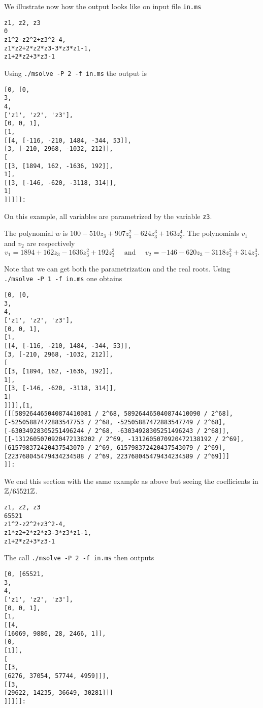 \documentclass[a4paper,english,11pt]{scrartcl}
\theoremstyle{definition}
\theoremstyle{remark}
\begin{document}
We illustrate now how the output looks like on input file \verb+in.ms+
\begin{tcolorbox}
\begin{verbatim}
z1, z2, z3
0
z1^2-z2^2+z3^2-4,
z1*z2+2*z2*z3-3*z3*z1-1,
z1+2*z2+3*z3-1
\end{verbatim}
\end{tcolorbox}
Using \verb+./msolve -P 2 -f in.ms+ the output is 
\begin{tcolorbox}
\begin{verbatim}
[0, [0, 
3, 
4, 
['z1', 'z2', 'z3'],
[0, 0, 1],
[1,
[[4, [-116, -210, 1484, -344, 53]],
[3, [-210, 2968, -1032, 212]],
[
[[3, [1894, 162, -1636, 192]],
1],
[[3, [-146, -620, -3118, 314]],
1]
]]]]]:
\end{verbatim}
\end{tcolorbox}
On this example, all variables are parametrized by the variable \verb+z3+. 

The polynomial $w$ is $100-510z_3 + 907z_3^2 -624z_3^3+ 163z_3^4$. 
The polynomials $v_1$ and $v_2$ are respectively 
\[
    v_1 = 1894 + 162 z_3 -1636 z_3^2+ 192 z_3^3 \quad \text{ and } 
    \quad v_2 = -146 -620 z_3 -3118 z_3^2+ 314 z_3^3.
\]

Note that we can get both the parametrization and the real roots. Using 
\verb+./msolve -P 1 -f in.ms+ one obtains

\begin{verbatim}
[0, [0, 
3, 
4, 
['z1', 'z2', 'z3'],
[0, 0, 1],
[1,
[[4, [-116, -210, 1484, -344, 53]],
[3, [-210, 2968, -1032, 212]],
[
[[3, [1894, 162, -1636, 192]],
1],
[[3, [-146, -620, -3118, 314]],
1]
]]]],[1,
[[[589264465040874410081 / 2^68, 589264465040874410090 / 2^68], [-52505887472883547753 / 2^68, -52505887472883547749 / 2^68], [-63034928305251496244 / 2^68, -63034928305251496243 / 2^68]], [[-1312605070920472138202 / 2^69, -1312605070920472138192 / 2^69], [615798372420437543070 / 2^69, 615798372420437543079 / 2^69], [223768045479434234588 / 2^69, 223768045479434234589 / 2^69]]]
]]:
\end{verbatim}

We end this section with the same example as above but seeing the coefficients in 
\(\mathbb{Z}/65521\mathbb{Z}\).
\begin{verbatim}
z1, z2, z3
65521
z1^2-z2^2+z3^2-4,
z1*z2+2*z2*z3-3*z3*z1-1,
z1+2*z2+3*z3-1
\end{verbatim}
The call \verb+./msolve -P 2 -f in.ms+ then outputs
\begin{verbatim}
[0, [65521, 
3, 
4, 
['z1', 'z2', 'z3'],
[0, 0, 1],
[1,
[[4,
[16069, 9886, 28, 2466, 1]],
[0,
[1]],
[
[[3,
[6276, 37054, 57744, 4959]]],
[[3,
[29622, 14235, 36649, 30281]]]
]]]]]:
\end{verbatim}
\end{document}
